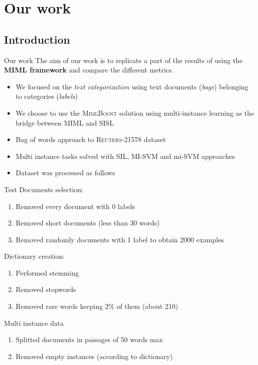 \section{Our work}

\subsection*{Introduction}
\begin{frame}{Our work}
	The aim of our work is to replicate a part of the results of \cite{miml1} using the \textbf{MIML framework} and compare the different metrics.\\
	\vspace{12px}
	\begin{itemize}
		\item We focused on the \textit{text categorization} using text documents (\textit{bags}) belonging to categories (\textit{labels})
		\item We choose to use the \textsc{MimlBoost} solution using multi-instance learning as the bridge between MIML and SISL
		\item Bag of words approach to \textsc{Reuters-21578} dataset
		\item Multi instance tasks solved with SIL, MI-SVM and mi-SVM approaches
		\item Dataset was processed as follows
	\end{itemize}
\end{frame}

\begin{frame}{Test}
	Documents selection:
	\begin{enumerate}
		\item Removed every document with 0 labels
		\item Removed short documents (less than 30 words)
		\item Removed randomly documents with 1 label to obtain 2000 examples
	\end{enumerate}
	Dictionary creation:
	\begin{enumerate}
		\item Performed stemming
		\item Removed stopwords
		\item Removed rare words keeping $2\%$ of them (about 210)
	\end{enumerate}
	Multi instance data
	\begin{enumerate}
		\item Splitted documents in passages of 50 words max
		\item Removed empty instances (according to dictionary)
	\end{enumerate}
\end{frame}

